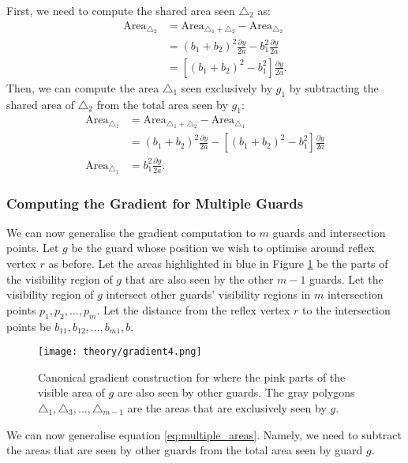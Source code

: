 First, we need to compute the shared area seen $\triangle_2$ as:
\begin{align}
    \text{Area}_{\triangle_2} &= \text{Area}_{\triangle_1 + \triangle_2} - \text{Area}_{\triangle_2} \\
                              &= (b_1 + b_2)^2\frac{\partial y}{2a} - b_1^2\frac{\partial y}{2a} \\
                              &= \left[(b_1 + b_2)^2 - b_1^2\right]\frac{\partial y}{2a}. \label{eq:multiple_areas} 
\end{align}
Then, we can compute the area $\triangle_1$ seen exclusively by $g_1$ by subtracting the shared area of $\triangle_2$ from the total area seen by $g_1$: 
\begin{align*}
    \text{Area}_{\triangle_1} &= \text{Area}_{\triangle_1 + \triangle_2} - \text{Area}_{\triangle_1} \\
                              &= (b_1 + b_2)^2\frac{\partial y}{2a} - \left[(b_1 + b_2)^2 - b_1^2\right]\frac{\partial y}{2a} \\
    \text{Area}_{\triangle_1} &= b_1^2\frac{\partial y}{2a}. 
\end{align*}

\subsubsection{Computing the Gradient for Multiple Guards}
We can now generalise the gradient computation to $m$ guards and intersection points. Let $g$ be the guard whose position we wish to optimise around reflex vertex $r$ as before. Let the areas highlighted in blue in Figure \ref{fig:general_gradient} be the parts of the visibility region of $g$ that are also seen by the other $m - 1$ guards. Let the visibility region of $g$ intersect other guards' visibility regions in $m$ intersection points $p_1, p_2, ..., p_m$. Let the distance from the reflex vertex $r$ to the intersection points be $b_{11}, b_{12}, ..., b_{m1}, b$.

\begin{figure}[h!]
    \centering
    \texttt{[image: theory/gradient4.png]}
    \caption{Canonical gradient construction for where the pink parts of the visible area of $g$ are also seen by other guards. The gray polygons $\triangle_1, \triangle_3, ..., \triangle_{m - 1}$ are the areas that are exclusively seen by $g$.}
    \label{fig:general_gradient} 
\end{figure}

We can now generalise equation \ref{eq:multiple_areas}. Namely, we need to subtract the areas that are seen by other guards from the total area seen by guard $g$. 

